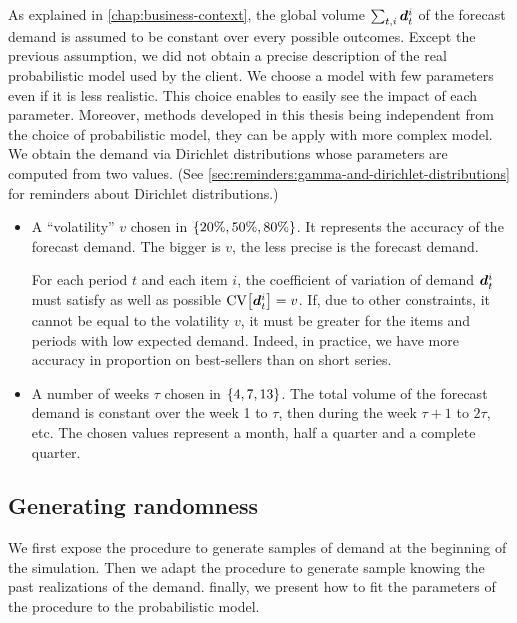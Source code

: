 As explained in \cref{chap:business-context}, the global volume $\sum_{t,i}\va\demand_t^i$ of the forecast demand is assumed to be constant over every possible outcomes.
Except the previous assumption, we did not obtain a precise description of the real probabilistic model used by the client.
We choose a model with few parameters even if it is less realistic.
This choice enables to easily see the impact of each parameter.
Moreover, methods developed in this thesis being independent from the choice of probabilistic model, they can be apply with more complex model.
We obtain the demand via Dirichlet distributions whose parameters are computed from two values.
(See \cref{sec:reminders:gamma-and-dirichlet-distributions} for reminders about Dirichlet distributions.)
\begin{itemize}
  \item A ``volatility'' $v$ chosen in $\crbracket{20\%, 50\%, 80\%}$.
  It represents the accuracy of the forecast demand.
  The bigger is $v$, the less precise is the forecast demand.

  For each period $t$ and each item $i$, the coefficient of variation of demand $\va\demand_t^i$ must satisfy as well as possible $\CV\sqbracket{\va\demand_t^i}=v$.
  If, due to other constraints, it cannot be equal to the volatility $v$, it must be greater for the items and periods with low expected demand.
  Indeed, in practice, we have more accuracy in proportion on best-sellers than on short series.
  \item A number of weeks $\tau$ chosen in $\crbracket{4,7,13}$.
  The total volume of the forecast demand is constant over the week 1 to $\tau$, then during the week $\tau+1$ to $2\tau$, etc.
  The chosen values represent a month, half a quarter and a complete quarter.
\end{itemize}



\subsection{Generating randomness}
\label{sec:PDP:numerical-experiments:dirichlet}


We first expose the procedure to generate samples of demand at the beginning of the simulation.
Then we adapt the procedure to generate sample knowing the past realizations of the demand.
finally, we present how to fit the parameters of the procedure to the probabilistic model.

